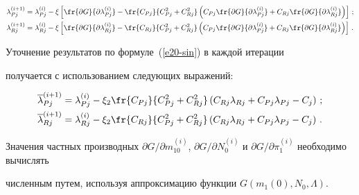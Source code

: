      \begin{align*}

     \lambda_{Pj}^{(i+1)} &= \lambda_{Pj}^{(i)} -\xi \left[ \fr{\partial G}{\partial

\lambda_{Pj}^{(i)}} -\fr{C_{Pj}}{C^2_{Pj}+C^2_{Rj}}\left( C_{Pj} \fr{\partial

G}{\partial \lambda^{(i)}_{Pj}}+C_{Rj} \fr{\partial G}{\partial

\lambda_{Rj}^{(i)}}\right)\right]\,; %

\\

     \lambda_{Rj}^{(i+1)} &= \lambda_{Rj}^{(i)} -\xi \left[ \fr{\partial G}{\partial

\lambda_{Rj}^{(i)}} -\fr{C_{Rj}}{C^2_{Pj}+C^2_{Rj}}\left( C_{Pj} \fr{\partial

G}{\partial \lambda^{(i)}_{Pj}}+C_{Rj} \fr{\partial G}{\partial

\lambda_{Rj}^{(i)}}\right)\right]\,. %

    \end{align*}



     Уточнение результатов по формуле~(\ref{e20-sin}) в каждой итерации

получается с использованием следующих выражений:

    \begin{align*}

    \overline{\lambda}^{(i+1)}_{Pj} &= \lambda^{(i)}_{Pj} -\xi_2

\fr{C_{Pj}}{C^2_{Pj}+C^2_{Rj}}\left(  C_{Rj}\lambda_{Rj}+C_{Pj}\lambda_{Pj}-

C_j\right)\,; %

\\

    \overline{\lambda}^{(i+1)}_{Rj} &= \lambda^{(i)}_{Rj} -\xi_2

\fr{C_{Rj}}{C^2_{Pj}+C^2_{Rj}}\left(  C_{Rj}\lambda_{Rj}+C_{Pj}\lambda_{Pj}-

C_j\right)\,. %

    \end{align*}



     Значения частных производных $\partial G/\partial m_{10}^{(i)}$, $\partial

G/\partial N_0^{(i)}$ и $\partial G/\partial\pi_1^{(i)}$ необходимо вычислять

численным путем, используя аппроксимацию функции $G(m_1(0),N_0,\Lambda)$.



